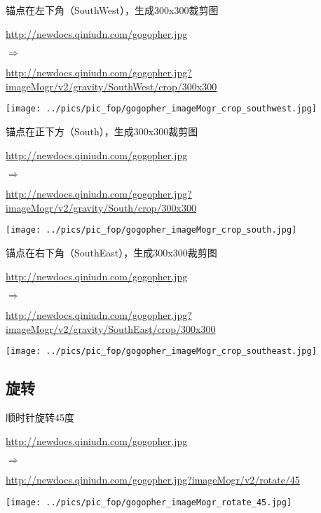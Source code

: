 \documentclass[11pt, oneside]{book}
\newcommand{\qsym}[1]{
\footnotesize
\noindent
#1\par
\normalsize
}
\newcommand{\qsamplelink}[1]{
\vspace{0.2em}
\noindent
#1\par
\vspace{0.1em}
}
\newcommand{\qurl}[1]{\footnotesize\url{#1}\normalsize}
\begin{document}
\begin{sample}
  \caption{锚点在左下角（SouthWest），生成300x300裁剪图}
    \qsamplelink{\qurl{http://newdocs.qiniudn.com/gogopher.jpg}}
    \qsym{$\Rightarrow$}
    \qsamplelink{\qurl{http://newdocs.qiniudn.com/gogopher.jpg?imageMogr/v2/gravity/SouthWest/crop/300x300}}

    \begin{center}
      \texttt{[image: ../pics/pic\_fop/gogopher\_imageMogr\_crop\_southwest.jpg]}
    \end{center}
  \label{imageMogr-crop-southwest}
\end{sample}

\begin{sample}
  \caption{锚点在正下方（South），生成300x300裁剪图}
    \qsamplelink{\qurl{http://newdocs.qiniudn.com/gogopher.jpg}}
    \qsym{$\Rightarrow$}
    \qsamplelink{\qurl{http://newdocs.qiniudn.com/gogopher.jpg?imageMogr/v2/gravity/South/crop/300x300}}

    \begin{center}
      \texttt{[image: ../pics/pic\_fop/gogopher\_imageMogr\_crop\_south.jpg]}
    \end{center}
  \label{imageMogr-crop-south}
\end{sample}

\begin{sample}
  \caption{锚点在右下角（SouthEast），生成300x300裁剪图}
    \qsamplelink{\qurl{http://newdocs.qiniudn.com/gogopher.jpg}}
    \qsym{$\Rightarrow$}
    \qsamplelink{\qurl{http://newdocs.qiniudn.com/gogopher.jpg?imageMogr/v2/gravity/SouthEast/crop/300x300}}

    \begin{center}
      \texttt{[image: ../pics/pic\_fop/gogopher\_imageMogr\_crop\_southeast.jpg]}
    \end{center}
  \label{imageMogr-crop-southeast}
\end{sample}

\clearpage

\subsection{旋转}

\begin{sample}
  \caption{顺时针旋转45度}
    \qsamplelink{\qurl{http://newdocs.qiniudn.com/gogopher.jpg}}
    \qsym{$\Rightarrow$}
    \qsamplelink{\qurl{http://newdocs.qiniudn.com/gogopher.jpg?imageMogr/v2/rotate/45}}

    \begin{center}
      \texttt{[image: ../pics/pic\_fop/gogopher\_imageMogr\_rotate\_45.jpg]}
    \end{center}
  \label{imageMogr-rotate-45}
\end{sample}
\end{document}
